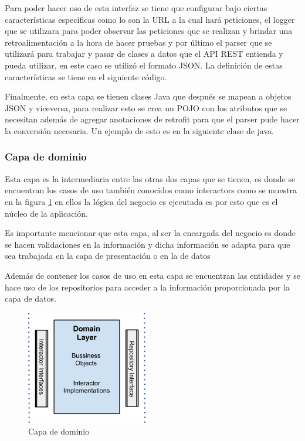 

Para poder hacer uso de esta interfaz se tiene que configurar bajo ciertas características específicas como lo son la URL a la cual hará peticiones, el logger que se utilizara para poder observar las peticiones que se realizan y brindar una retroalimentación a la hora de hacer pruebas y por último el parser que se utilizará para trabajar y pasar de clases a datos que el API REST entienda y pueda utilizar, en este caso se utilizó el formato JSON. La definición de estas características se tiene en el siguiente código.



Finalmente, en esta capa se tienen clases Java que después se mapean a objetos JSON y viceversa, para realizar esto se crea un POJO con los atributos que se necesitan además de agregar anotaciones de retrofit para que el parser pude hacer la conversión necesaria. Un ejemplo de esto es en la siguiente clase de java.




\subsubsection{Capa de dominio}
Esta capa es la intermediaria entre las otras dos capas que se tienen, es donde se encuentran los casos de uso también conocidos como interactors como se muestra en la figura \ref{fig:capa-dominio} en ellos la lógica del negocio es ejecutada es por esto que es el núcleo de la aplicación.

Es importante mencionar que esta capa, al ser la encargada del negocio es donde se hacen validaciones en la información y dicha información se adapta para que sea trabajada en la capa de presentación o en la de datos

Además de contener los casos de uso en esta capa se encuentran las entidades y se hace uso de los repositorios para acceder a la información proporcionada por la capa de datos.

\begin{figure}[h]
    \centering
    \includegraphics[width=200px]{capitulo5/android/img/capa-dominio.png}
    \caption{Capa de dominio \cite{cleanWay}}
    \label{fig:capa-dominio}
\end{figure}

